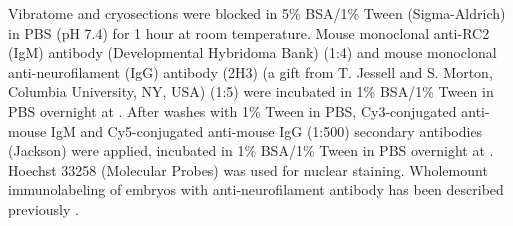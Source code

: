 Vibratome and cryosections were blocked in 5\% BSA/1\% Tween (Sigma-Aldrich) in PBS (pH 7.4) for 1 hour at room temperature.
Mouse monoclonal anti-RC2 (IgM) antibody (Developmental Hybridoma Bank) (1:4) and mouse monoclonal anti-neurofilament (IgG) antibody (2H3) (a gift from T. Jessell and S. Morton, Columbia University, NY, USA) (1:5) were incubated in 1\% BSA/1\% Tween in PBS overnight at .
After washes with 1\% Tween in PBS, Cy3-conjugated anti-mouse IgM and Cy5-conjugated anti-mouse IgG (1:500) secondary antibodies (Jackson) were applied, incubated in 1\% BSA/1\% Tween in PBS overnight at .
Hoechst 33258 (Molecular Probes) was used for nuclear staining.
Wholemount immunolabeling of embryos with anti-neurofilament antibody has been described previously \cite{huber2005distinct}.